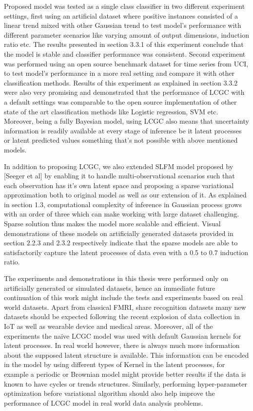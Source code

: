 Proposed model was tested as a single class classifier in two different experiment settings, first using an artificial dataset where positive instances consisted of a linear trend mixed with other Gaussian trend to test model’s performance with different parameter scenarios like varying amount of output dimensions, induction ratio etc. The results presented in section 3.3.1 of this experiment conclude that the model is stable and classifier performance was consistent. Second experiment was performed using an open source benchmark dataset for time series from UCI, to test model’s performance in a more real setting and compare it with other classification methods. Results of this experiment as explained in section 3.3.2 were also very promising and demonstrated that the performance of LCGC with a default settings was comparable to the open source implementation of other state of the art classification methods like Logistic regression, SVM etc. Moreover, being a fully Bayesian model, using LCGC also means that uncertainty information is readily available at every stage of inference be it latent processes or latent predicted values something that’s not possible with above mentioned models.

In addition to proposing LCGC, we also extended SLFM model proposed by [Seeger et al] by enabling it to handle multi-observational scenarios such that each observation has it's own latent space and proposing a sparse variational approximation both to original model as well as our extension of it. As explained in section 1.3, computational complexity of inference in Gaussian process grows with an order of three which can make working with large dataset challenging. Sparse solution thus makes the model more scalable and efficient. Visual demonstrations of these models on artificially generated datasets provided in section 2.2.3 and 2.3.2 respectively indicate that the sparse models are able to satisfactorily capture the latent processes of data even with a 0.5 to 0.7 induction ratio.

The experiments and demonstrations in this thesis were performed only on artificially generated or simulated datasets, hence an immediate future continuation of this work might include the tests and experiments based on real world datasets. Apart from classical FMRI, share recognition datasets many new datasets should be expected following the recent explosion of data collection in IoT as well as wearable device and medical areas. Moreover, all of the experiments the naïve LCGC model was used with default Gaussian kernels for latent processes. In real world however, there is always much more information about the supposed latent structure is available. This information can be encoded in the model by using different types of Kernel in the latent processes, for example a periodic or Brownian model might provide better results if the data is known to have cycles or trends structures. Similarly, performing hyper-parameter optimization before variational algorithm should also help improve the performance of LCGC model in real world data analysis problems. 
